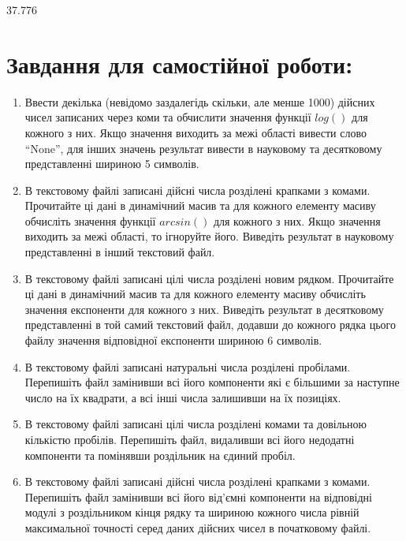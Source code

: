 \documentclass[a5paper,titlepage,openany,twoside,
]
{book_unv}%
\begin{document}
\begin{enumerate}
\begin{enumerate}
37.776

\end{enumerate}

\section{Завдання для самостійної роботи:}

\begin{enumerate}
\def\labelenumi{\arabic{enumi})}
\setcounter{enumi}{5}
\item
  Ввести декілька (невідомо заздалегідь скільки, але менше 1000) дійсних чисел записаних
  через коми та обчислити значення функції $log()$ для кожного з них. Якщо
  значення виходить за межі області вивести слово ``None'', для інших
  значень результат вивести в науковому та десятковому представленні
  шириною 5 символів.

\item
  В текстовому файлі записані дійсні числа розділені
 крапками з комами. Прочитайте ці дані в динамічний масив та 
 для кожного елементу масиву обчисліть значення функції $arcsin()$ для кожного з них. 
 Якщо значення виходить за межі області, то ігноруйте його. 
 Виведіть результат в науковому представленні в інший текстовий файл.

\item
  В текстовому файлі записані цілі числа розділені
новим рядком. Прочитайте ці дані в динамічний масив та 
 для кожного елементу масиву обчисліть значення експоненти для кожного з них. 
 Виведіть результат в десятковому представленні в той самий текстовий файл,
додавши до кожного рядка цього файлу значення відповідної експоненти шириною 6 символів.

\item
  В текстовому файлі записані натуральні числа розділені
пробілами. Перепишіть файл замінивши всі його компоненти які є
більшими за наступне число на їх квадрати, а всі інші числа залишивши на їх позиціях.

\item
  В текстовому файлі записані цілі числа розділені комами та довільною кількістю пробілів. 
 Перепишіть файл, видаливши всі його недодатні компоненти та помінявши роздільник на єдиний пробіл.

\item
В текстовому файлі записані дійсні числа розділені
 крапками з комами.  Перепишіть файл замінивши всі його від'ємні компоненти 
на відповідні модулі з роздільником кінця рядку та шириною кожного числа рівній
максимальної точності серед даних дійсних чисел в початковому файлі.
   


\end{enumerate}
\end{enumerate}
\end{document}
